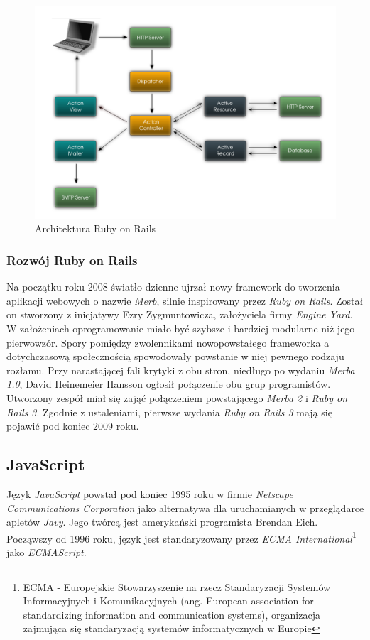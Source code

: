 \documentclass[a4paper,12pt]{article}
\begin{document}
\begin{figure}[ht]
  \begin{center}
    \includegraphics[width=\linewidth]{railsarchitecture.png}
  \end{center}
  \caption{Architektura Ruby on Rails}
  \label{railsarchitecture}
\end{figure}

\subsubsection{Rozwój Ruby on Rails}
Na początku roku 2008 światło dzienne ujrzał nowy framework do
tworzenia aplikacji webowych o nazwie \emph{Merb}, silnie inspirowany
przez \emph{Ruby on Rails}. Został on stworzony z inicjatywy Ezry
Zygmuntowicza, założyciela firmy \emph{Engine Yard}. W założeniach
oprogramowanie miało być szybsze i bardziej modularne niż jego
pierwowzór. Spory pomiędzy zwolennikami nowopowstałego frameworka a
dotychczasową społecznością spowodowały powstanie w niej pewnego
rodzaju rozłamu. Przy narastającej fali krytyki z obu stron, niedługo
po wydaniu \emph{Merba 1.0}, David Heinemeier Hansson ogłosił
połączenie obu grup programistów\cite{merge}. Utworzony zespół miał
się zająć połączeniem powstającego \emph{Merba 2} i \emph{Ruby on
  Rails 3}. Zgodnie z ustaleniami, pierwsze wydania \emph{Ruby on
  Rails 3} mają się pojawić pod koniec 2009 roku.

\subsection{JavaScript}
Język \emph{JavaScript} powstał pod koniec 1995 roku w firmie
\emph{Netscape Communications Corporation} jako alternatywa dla
uruchamianych w przeglądarce apletów \emph{Javy}. Jego twórcą jest
amerykański programista Brendan Eich. Począwszy od 1996 roku, język
jest standaryzowany przez \emph{ECMA International}\footnote{ECMA -
  Europejskie Stowarzyszenie na rzecz Standaryzacji Systemów
  Informacyjnych i Komunikacyjnych (ang. European association for
  standardizing information and communication systems), organizacja
  zajmująca się standaryzacją systemów informatycznych w
  Europie\cite{ecma}} jako \emph{ECMAScript}.
\label{javascript}
\end{document}
